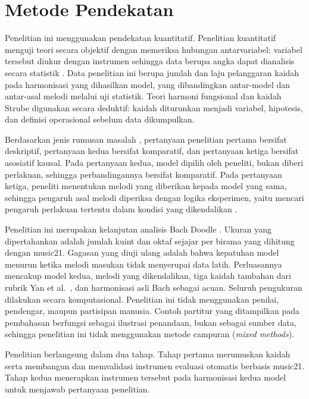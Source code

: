 \section{Metode Pendekatan}

Penelitian ini menggunakan pendekatan kuantitatif. Penelitian kuantitatif menguji teori secara objektif dengan memeriksa hubungan antarvariabel; variabel tersebut diukur dengan instrumen sehingga data berupa angka dapat dianalisis secara statistik \parencite{creswell2018}. Data penelitian ini berupa jumlah dan laju pelanggaran kaidah pada harmonisasi yang dihasilkan model, yang dibandingkan antar-model dan antar-asal melodi melalui uji statistik. Teori harmoni fungsional dan kaidah Strube digunakan secara deduktif: kaidah diturunkan menjadi variabel, hipotesis, dan definisi operasional sebelum data dikumpulkan.

Berdasarkan jenis rumusan masalah \parencite{sugiyono2019}, pertanyaan penelitian pertama bersifat deskriptif, pertanyaan kedua bersifat komparatif, dan pertanyaan ketiga bersifat asosiatif kausal. Pada pertanyaan kedua, model dipilih oleh peneliti, bukan diberi perlakuan, sehingga perbandingannya bersifat komparatif. Pada pertanyaan ketiga, peneliti menentukan melodi yang diberikan kepada model yang sama, sehingga pengaruh asal melodi diperiksa dengan logika eksperimen, yaitu mencari pengaruh perlakuan tertentu dalam kondisi yang dikendalikan \parencite{sugiyono2019}.

Penelitian ini merupakan kelanjutan analisis Bach Doodle \parencite{huang2019}. Ukuran yang dipertahankan adalah jumlah kuint dan oktaf sejajar per birama yang dihitung dengan music21. Gagasan yang diuji ulang adalah bahwa kepatuhan model menurun ketika melodi masukan tidak menyerupai data latih. Perluasannya mencakup model kedua, melodi yang dikendalikan, tiga kaidah tambahan dari rubrik Yan et al.\ \parencite{yan2018}, dan harmonisasi asli Bach sebagai acuan. Seluruh pengukuran dilakukan secara komputasional. Penelitian ini tidak menggunakan penilai, pendengar, maupun partisipan manusia. Contoh partitur yang ditampilkan pada pembahasan berfungsi sebagai ilustrasi penandaan, bukan sebagai sumber data, sehingga penelitian ini tidak menggunakan metode campuran (\textit{mixed methods}).

Penelitian berlangsung dalam dua tahap. Tahap pertama merumuskan kaidah serta membangun dan memvalidasi instrumen evaluasi otomatis berbasis music21. Tahap kedua menerapkan instrumen tersebut pada harmonisasi kedua model untuk menjawab pertanyaan penelitian.


